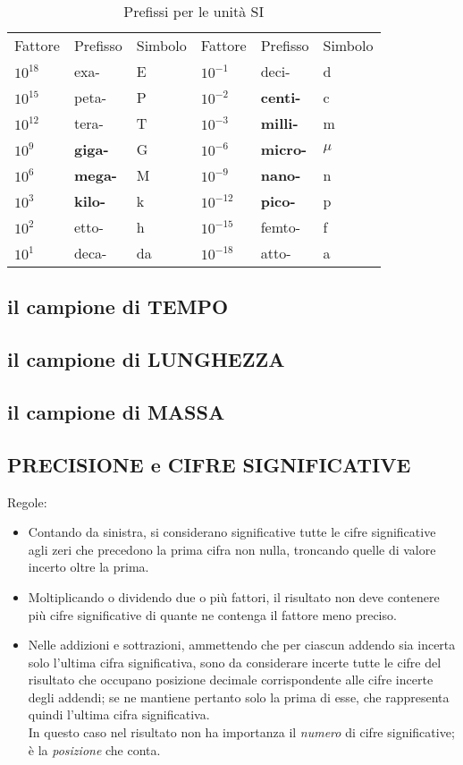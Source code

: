 \documentclass{article}
\begin{document}
			\begin{table}[!htb]
			\begin{tabular}{|lll|lll|}
				\hline
				Fattore & Prefisso & Simbolo & Fattore & Prefisso & Simbolo \\
				$10^{18}$ & exa- & E & $10^{-1}$ & deci- & d \\
				$10^{15}$ & peta- & P & $10^{-2}$ & \textbf{centi-} & c \\
				$10^{12}$ & tera- & T & $10^{-3}$ & \textbf{milli-} & m \\
				$10^{9}$ & \textbf{giga-} & G & $10^{-6}$ & \textbf{micro-} & $\mu$ \\
				$10^{6}$ & \textbf{mega-} & M & $10^{-9}$ & \textbf{nano-} & n \\
				$10^{3}$ & \textbf{kilo-} & k & $10^{-12}$ & \textbf{pico-} & p \\
				$10^{2}$ & etto- & h & $10^{-15}$ & femto- & f \\
				$10^{1}$ & deca- & da & $10^{-18}$ & atto- & a \\ \hline
			\end{tabular}
			\caption{Prefissi per le unità SI}
			\end{table}

		\subsection{il campione di TEMPO}
		\subsection{il campione di LUNGHEZZA}
		\subsection{il campione di MASSA}

		\subsection{PRECISIONE e CIFRE SIGNIFICATIVE}
			Regole:
			\begin{itemize}
\item Contando da sinistra, si considerano significative tutte le cifre significative agli zeri che precedono la prima cifra non nulla, troncando quelle di valore incerto oltre la prima.
\item Moltiplicando o dividendo due o più fattori, il risultato non deve contenere più cifre significative di quante ne contenga il fattore meno preciso.
\item Nelle addizioni e sottrazioni, ammettendo che per ciascun addendo sia incerta solo l'ultima cifra significativa, sono da considerare incerte tutte le cifre del risultato che occupano posizione decimale corrispondente alle cifre incerte degli addendi; se ne mantiene pertanto solo la prima di esse, che rappresenta quindi l'ultima cifra significativa. \\
In questo caso nel risultato non ha importanza il \textit{numero} di cifre significative; è la \textit{posizione} che conta.
			\end{itemize}
\end{document}
